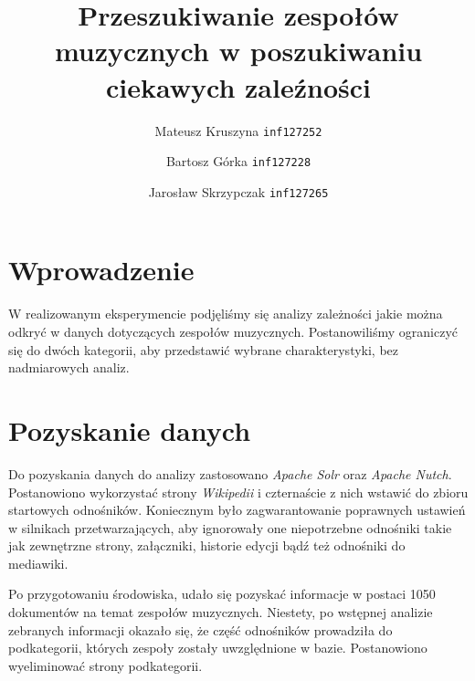 \documentclass[journal]{article}
\begin{document}
\title{Przeszukiwanie zespołów muzycznych w poszukiwaniu ciekawych zaleźności}
\author{
    Mateusz Kruszyna \texttt{inf127252}\\
    \and
    Bartosz Górka \texttt{inf127228}\\
    \and
    Jarosław Skrzypczak \texttt{inf127265}
}
\maketitle

\section{Wprowadzenie}
W realizowanym eksperymencie podjęliśmy się analizy zależności jakie można odkryć
 w danych dotyczących zespołów muzycznych.
Postanowiliśmy ograniczyć się do dwóch kategorii,
aby przedstawić wybrane charakterystyki, bez nadmiarowych analiz.

\section{Pozyskanie danych}

Do pozyskania danych do analizy zastosowano  \textit{Apache Solr} oraz  \textit{Apache Nutch}.
Postanowiono wykorzystać strony  \textit{Wikipedii} i czternaście z nich wstawić
do zbioru startowych odnośników. Koniecznym było zagwarantowanie poprawnych
ustawień w silnikach przetwarzających, aby ignorowały one niepotrzebne odnośniki
takie jak zewnętrzne strony, załączniki, historie edycji bądź też odnośniki do mediawiki.

Po przygotowaniu środowiska, udało się pozyskać informacje w postaci 1050 dokumentów
na temat zespołów muzycznych. Niestety, po wstępnej analizie zebranych informacji
okazało się, że część odnośników prowadziła do podkategorii, których zespoły zostały
uwzględnione w bazie. Postanowiono wyeliminować strony podkategorii.
\end{document}
